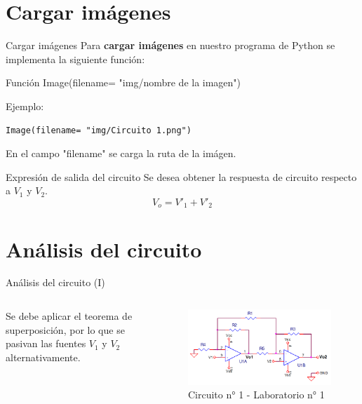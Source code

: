 \documentclass[14pt, aspectratio= 169]{beamer}
\begin{document}
\section{Cargar imágenes}
\begin{frame}[fragile]{Cargar imágenes}
Para \textbf{cargar imágenes} en nuestro programa de Python se implementa la siguiente función:

\begin{block}{Función}
Image(filename= "img/nombre de la imagen")
\end{block}
Ejemplo:
\begin{lstlisting}[style=python]
Image(filename= "img/Circuito 1.png")
\end{lstlisting}
En el campo "filename" se carga la ruta de la imágen.
\end{frame}

\begin{frame}{Expresión de salida del circuito}
Se desea obtener la respuesta de circuito respecto a $V_{1}$ y $V_{2}$.
$$ \boxed{ V_{o}= V'_{1} + V'_{2} } $$
\end{frame}

\section{Análisis del circuito}
\begin{frame}{Análisis del circuito (I)}
    \begin{columns}
         Se debe aplicar el teorema de superposición, por lo que se pasivan las fuentes $V_{1}$ y $V_{2}$ alternativamente.
        \begin{figure}
        \centering
        \includegraphics[width=1.0\linewidth]{img/Circuito 1.png}
        \caption{Circuito n° 1 - Laboratorio n° 1}
        \label{fig:enter-label}
    \end{figure}
    \end{columns}
\end{frame}
\end{document}
